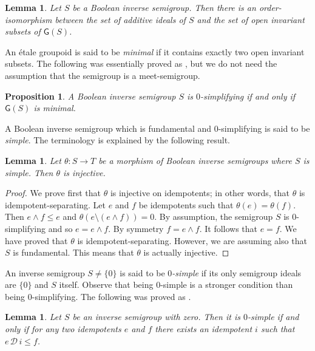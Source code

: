 \documentclass[a4paper]{amsart}
\newtheorem{lemma}[theorem]{Lemma}
\newtheorem{proposition}[theorem]{Proposition}
\begin{document}
\begin{lemma} Let $S$ be a Boolean inverse semigroup.
Then there is an order-isomorphism between the set of additive ideals of $S$
and the set of open invariant subsets of $\mathsf{G}(S)$.
\end{lemma}

An \'etale groupoid is said to be {\em minimal} if it contains exactly two open invariant subsets.
The following was essentially proved as \cite[Corollary 4.8]{Lawson3},
but we do not need the assumption that the semigroup is a meet-semigroup.


\begin{proposition}\label{prop:zero-simplifying} A Boolean inverse semigroup $S$ is
$0$-simplifying if and only if $\mathsf{G}(S)$ is minimal.
\end{proposition}


A Boolean inverse semigroup which is fundamental and $0$-simplifying is said to be {\em simple}.
The terminology is explained by the following result.

\begin{lemma}Let $\theta\colon S \rightarrow T$ be a morphism of Boolean inverse semigroups
where $S$ is simple. Then $\theta$ is injective. 
\end{lemma}
\begin{proof} We prove first that $\theta$ is injective on idempotents;
in other words, that $\theta$ is idempotent-separating.
Let $e$ and $f$ be idempotents such that $\theta (e) = \theta (f)$.
Then $e \wedge f \leq e$ and $\theta (e \setminus (e \wedge f)) = 0$.
By assumption, the semigroup $S$ is $0$-simplifying and so $e = e \wedge f$.
By symmetry $f = e \wedge f$.
It follows that $e = f$.
We have proved that $\theta$ is idempotent-separating.
However, we are assuming also that $S$ is fundamental.
This means that $\theta$ is actually injective.
\end{proof}


An inverse semigroup $S \neq \{0\}$ 
is said to be {\em $0$-simple} if its only semigroup ideals
are $\{0\}$ and $S$ itself.
Observe that being $0$-simple is a stronger condition than being $0$-simplifying.
The following was proved as \cite[Proposition 3.2.10]{Lawson1998}.

\begin{lemma}\label{lem:zero-simple} Let $S$ be an inverse semigroup with zero.
Then it is $0$-simple if and only if for any two idempotents $e$ and $f$ there exists an idempotent $i$ such that $e \,\mathscr{D}\, i \leq f$.
\end{lemma}
\end{document}
